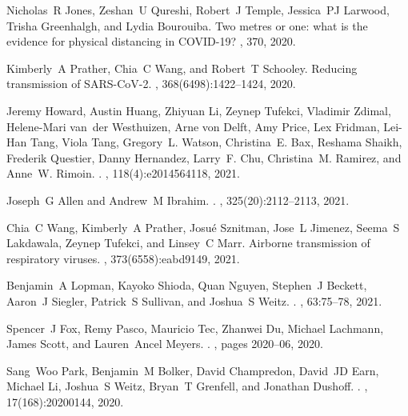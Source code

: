 \documentclass[12pt]{article}
\begin{document}
\begin{thebibliography}{10}
Nicholas~R Jones, Zeshan~U Qureshi, Robert~J Temple, Jessica~PJ Larwood, Trisha
  Greenhalgh, and Lydia Bourouiba.
\newblock Two metres or one: what is the evidence for physical distancing in
  {COVID-19?}
, 370, 2020.

Kimberly~A Prather, Chia~C Wang, and Robert~T Schooley.
\newblock Reducing transmission of {SARS-CoV-2}.
, 368(6498):1422--1424, 2020.

Jeremy Howard, Austin Huang, Zhiyuan Li, Zeynep Tufekci, Vladimir Zdimal,
  Helene-Mari van~der Westhuizen, Arne von Delft, Amy Price, Lex Fridman,
  Lei-Han Tang, Viola Tang, Gregory~L. Watson, Christina~E. Bax, Reshama
  Shaikh, Frederik Questier, Danny Hernandez, Larry~F. Chu, Christina~M.
  Ramirez, and Anne~W. Rimoin.
.
,
  118(4):e2014564118, 2021.

Joseph~G Allen and Andrew~M Ibrahim.
.
, 325(20):2112--2113, 2021.

Chia~C Wang, Kimberly~A Prather, Josu{\'e} Sznitman, Jose~L Jimenez, Seema~S
  Lakdawala, Zeynep Tufekci, and Linsey~C Marr.
\newblock Airborne transmission of respiratory viruses.
, 373(6558):eabd9149, 2021.

Benjamin~A Lopman, Kayoko Shioda, Quan Nguyen, Stephen~J Beckett, Aaron~J
  Siegler, Patrick~S Sullivan, and Joshua~S Weitz.
.
, 63:75--78, 2021.

Spencer~J Fox, Remy Pasco, Mauricio Tec, Zhanwei Du, Michael Lachmann, James
  Scott, and Lauren~Ancel Meyers.
.
, pages 2020--06, 2020.

Sang~Woo Park, Benjamin~M Bolker, David Champredon, David~JD Earn, Michael Li,
  Joshua~S Weitz, Bryan~T Grenfell, and Jonathan Dushoff.
.
, 17(168):20200144, 2020.


\end{thebibliography}
\end{document}
